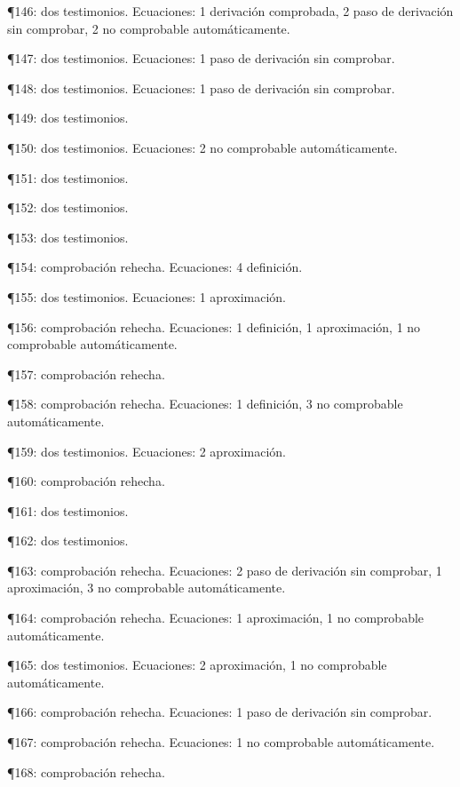 \documentclass[10pt,openany]{book}
\begin{document}
\noindent ¶146: dos testimonios. Ecuaciones: 1 derivación comprobada, 2 paso de derivación sin comprobar, 2 no comprobable automáticamente.\par
\noindent ¶147: dos testimonios. Ecuaciones: 1 paso de derivación sin comprobar.\par
\noindent ¶148: dos testimonios. Ecuaciones: 1 paso de derivación sin comprobar.\par
\noindent ¶149: dos testimonios.\par
\noindent ¶150: dos testimonios. Ecuaciones: 2 no comprobable automáticamente.\par
\noindent ¶151: dos testimonios.\par
\noindent ¶152: dos testimonios.\par
\noindent ¶153: dos testimonios.\par
\noindent ¶154: comprobación rehecha. Ecuaciones: 4 definición.\par
\noindent ¶155: dos testimonios. Ecuaciones: 1 aproximación.\par
\noindent ¶156: comprobación rehecha. Ecuaciones: 1 definición, 1 aproximación, 1 no comprobable automáticamente.\par
\noindent ¶157: comprobación rehecha.\par
\noindent ¶158: comprobación rehecha. Ecuaciones: 1 definición, 3 no comprobable automáticamente.\par
\noindent ¶159: dos testimonios. Ecuaciones: 2 aproximación.\par
\noindent ¶160: comprobación rehecha.\par
\noindent ¶161: dos testimonios.\par
\noindent ¶162: dos testimonios.\par
\noindent ¶163: comprobación rehecha. Ecuaciones: 2 paso de derivación sin comprobar, 1 aproximación, 3 no comprobable automáticamente.\par
\noindent ¶164: comprobación rehecha. Ecuaciones: 1 aproximación, 1 no comprobable automáticamente.\par
\noindent ¶165: dos testimonios. Ecuaciones: 2 aproximación, 1 no comprobable automáticamente.\par
\noindent ¶166: comprobación rehecha. Ecuaciones: 1 paso de derivación sin comprobar.\par
\noindent ¶167: comprobación rehecha. Ecuaciones: 1 no comprobable automáticamente.\par
\noindent ¶168: comprobación rehecha.\par
\end{document}
